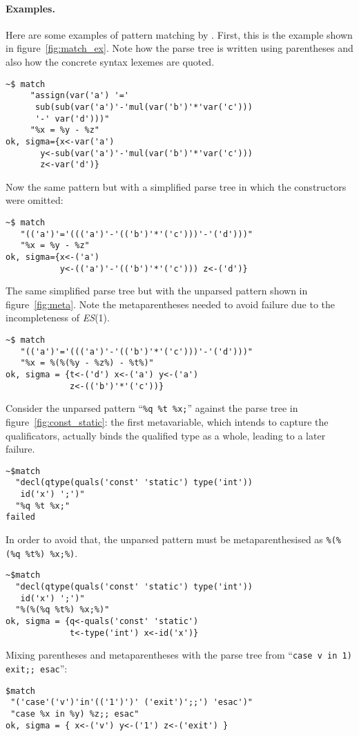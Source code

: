 \paragraph{Examples.}

Here are some examples of pattern matching by \Matchbox. First, this
is the example shown in figure~\ref{fig:match_ex}. Note how the parse
tree is written using parentheses and also how the concrete syntax
lexemes are quoted.
{\small
\begin{verbatim}
~$ match
     "assign(var('a') '='
      sub(sub(var('a')'-'mul(var('b')'*'var('c'))) 
      '-' var('d')))"
     "%x = %y - %z"
ok, sigma={x<-var('a')
       y<-sub(var('a')'-'mul(var('b')'*'var('c')))
       z<-var('d')}
\end{verbatim}
}
\noindent Now the same pattern but with a simplified parse tree in
which the constructors were omitted:
{\small
\begin{verbatim}
~$ match
   "(('a')'='((('a')'-'(('b')'*'('c')))'-'('d')))"
   "%x = %y - %z"
ok, sigma={x<-('a') 
           y<-(('a')'-'(('b')'*'('c'))) z<-('d')}
\end{verbatim}
}
The same simplified parse tree but with the unparsed pattern shown
in figure~\ref{fig:meta}. Note the meta\-parentheses needed to avoid
failure due to the incompleteness of \textit{ES}(1).
{\small
\begin{verbatim}
~$ match
   "(('a')'='((('a')'-'(('b')'*'('c')))'-'('d')))"
   "%x = %(%(%y - %z%) - %t%)"
ok, sigma = {t<-('d') x<-('a') y<-('a')
             z<-(('b')'*'('c'))}
\end{verbatim}
}
Consider the unparsed pattern ``\texttt{\%q \%t \%x;}'' against the
parse tree in figure~\ref{fig:const_static}: the first meta\-variable,
which intends to capture the qualificators, actually binds the
qualified type as a whole, leading to a later failure.
{\small
\begin{verbatim}
~$match
  "decl(qtype(quals('const' 'static') type('int'))
   id('x') ';')"
  "%q %t %x;"
failed
\end{verbatim}
}
In order to avoid that, the unparsed pattern must be
meta\-parenthesised as \texttt{\%(\%(\%q \%t\%) \%x;\%)}.
{\small
\begin{verbatim}
~$match
  "decl(qtype(quals('const' 'static') type('int'))
   id('x') ';')"
  "%(%(%q %t%) %x;%)"
ok, sigma = {q<-quals('const' 'static')
             t<-type('int') x<-id('x')}
\end{verbatim}
}
Mixing parentheses and meta\-parentheses with the parse
tree from ``\texttt{case v in 1) exit;; esac}'':
{\small
\begin{verbatim}
$match
 "('case'('v')'in'(('1')')' ('exit')';;') 'esac')"
 "case %x in %y) %z;; esac"
ok, sigma = { x<-('v') y<-('1') z<-('exit') }
\end{verbatim}
}

